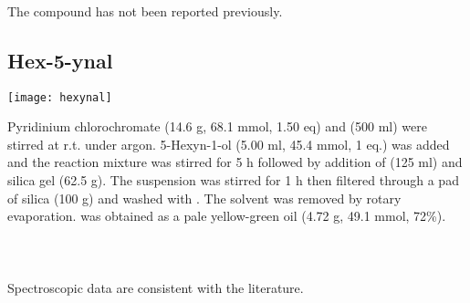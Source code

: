 \\[1\baselineskip]
\\[1\baselineskip]
\\[1\baselineskip]
The compound has not been reported previously.

\subsection{Hex-5-ynal }


\begin{scheme}[H]
	\begin{center}
		\texttt{[image: hexynal]}
	\end{center}
\end{scheme}

Pyridinium chlorochromate (14.6 g, 68.1 mmol, 1.50 eq) and  (500 ml) were stirred at r.t. under argon. 5-Hexyn-1-ol  (5.00 ml, 45.4 mmol, 1 eq.) was added and the reaction mixture was stirred for 5 h followed by addition of  (125 ml) and silica gel (62.5 g). The suspension was stirred for 1 h then filtered through a pad of silica (100 g) and washed with . The solvent was removed by rotary evaporation.  was obtained as a pale yellow-green oil (4.72 g, 49.1 mmol, 72\%).
\\[1\baselineskip]
\\[1\baselineskip]
\\[1\baselineskip]
\\[1\baselineskip]
Spectroscopic data are consistent with the literature\cite{Kocsis2012}.

